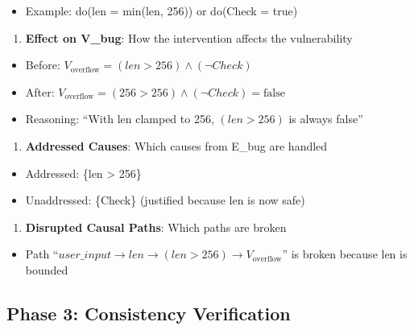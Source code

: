 \documentclass[conference,compsoc]{IEEEtran}
\providecommand{\tightlist}{\setlength{\itemsep}{0pt}\setlength{\parskip}{0pt}}
\begin{document}
\begin{itemize}
\tightlist
\item
  Example: do(len = min(len, 256)) or do(Check = true)
\end{itemize}

\begin{enumerate}
\def\labelenumi{\arabic{enumi}.}
\setcounter{enumi}{2}
\tightlist
\item
  \textbf{Effect on V\_bug}: How the intervention affects the
  vulnerability
\end{enumerate}

\begin{itemize}
\item
  Before: $V_{\text{overflow}} = (len > 256) \land (\lnot Check)$
\item
  After: $V_{\text{overflow}} = (256 > 256) \land (\lnot Check) = \text{false}$
\item
  Reasoning: ``With len clamped to 256, $(len > 256)$ is
  always false''
\end{itemize}

\begin{enumerate}
\def\labelenumi{\arabic{enumi}.}
\setcounter{enumi}{3}
\tightlist
\item
  \textbf{Addressed Causes}: Which causes from E\_bug are handled
\end{enumerate}

\begin{itemize}
\item
  Addressed: \{len \textgreater{} 256\}
\item
  Unaddressed: \{\lnot Check\} (justified because len is now safe)
\end{itemize}

\begin{enumerate}
\def\labelenumi{\arabic{enumi}.}
\setcounter{enumi}{4}
\tightlist
\item
  \textbf{Disrupted Causal Paths}: Which paths are broken
\end{enumerate}

\begin{itemize}
\tightlist
\item
  Path ``$user\_input \rightarrow len \rightarrow (len > 256) \rightarrow V_{\text{overflow}}$'' is
  broken because len is bounded
\end{itemize}

\subsection{Phase 3: Consistency
Verification}\label{phase-3-consistency-verification}
\end{document}
